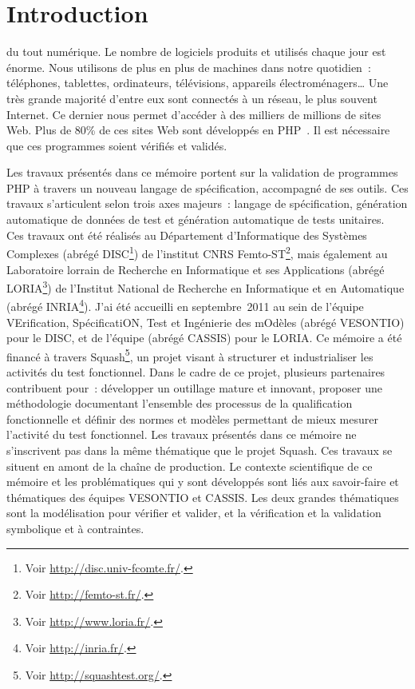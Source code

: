 \chapter{Introduction}
\label{chapter:introduction}

\mminitoc

 du tout numérique. Le nombre de logiciels produits et utilisés
chaque jour est énorme. Nous utilisons de plus en plus de machines dans notre
quotidien~: téléphones, tablettes, ordinateurs, télévisions, appareils
électroménagers… Une très grande majorité d'entre eux sont connectés à un
réseau, le plus souvent Internet. Ce dernier nous permet d'accéder à des
milliers de millions de sites Web. Plus de 80\% de ces sites Web sont développés
en PHP~. Il est nécessaire que ces programmes soient vérifiés et
validés.

Les travaux présentés dans ce mémoire portent sur la validation de programmes
PHP à travers un nouveau langage de spécification, accompagné de ses outils. Ces
travaux s'articulent selon trois axes majeurs~: langage de spécification,
génération automatique de données de test et génération automatique de tests
unitaires. \\

Ces travaux ont été réalisés au Département d'Informatique des Systèmes
Complexes (abrégé DISC\footnote{Voir \url{http://disc.univ-fcomte.fr/}.}) de
l'institut CNRS Femto-ST\footnote{Voir \url{http://femto-st.fr/}.}, mais
également au Laboratoire lorrain de Recherche en Informatique et ses
Applications (abrégé LORIA\footnote{Voir \url{http://www.loria.fr/}.}) de
l'Institut National de Recherche en Informatique et en Automatique (abrégé
INRIA\footnote{Voir \url{http://inria.fr/}.}). J'ai été accueilli en
septembre~2011 au sein de l'équipe VErification, SpécificatiON, Test et
Ingénierie des mOdèles (abrégé VESONTIO) pour le DISC, et de l'équipe
(abrégé CASSIS) pour le LORIA. Ce mémoire a été financé à travers
Squash\footnote{Voir \url{http://squashtest.org/}.}, un projet
 visant à structurer et industrialiser les activités du
test fonctionnel. Dans le cadre de ce projet, plusieurs partenaires contribuent
pour~: développer un outillage  mature et innovant,
proposer une méthodologie  documentant l'ensemble des
processus de la qualification fonctionnelle et définir des normes et modèles
permettant de mieux mesurer l'activité du test fonctionnel. Les travaux
présentés dans ce mémoire ne s'inscrivent pas dans la même thématique que le
projet Squash. Ces travaux se situent en amont de la chaîne de production. Le
contexte scientifique de ce mémoire et les problématiques qui y sont développés
sont liés aux savoir-faire et thématiques des équipes VESONTIO et CASSIS. Les
deux grandes thématiques sont la modélisation pour vérifier et valider, et la
vérification et la validation symbolique et à contraintes. \\

